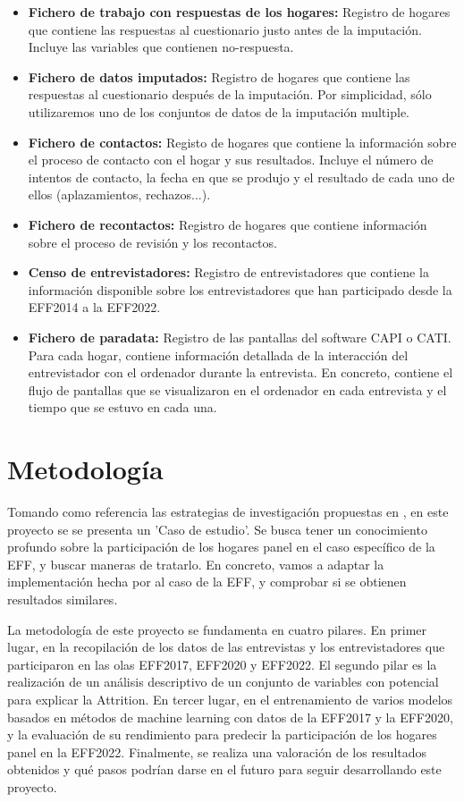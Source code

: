 \begin{itemize}
    \item \textbf{Fichero de trabajo con respuestas de los hogares:} Registro de hogares que contiene las respuestas al cuestionario justo antes de la imputación. Incluye las variables que contienen no-respuesta.
    \item \textbf{Fichero de datos imputados:} Registro de hogares que contiene las respuestas al cuestionario después de la imputación. Por simplicidad, sólo utilizaremos uno de los conjuntos de datos de la imputación multiple.
    \item \textbf{Fichero de contactos:} Registo de hogares que contiene la información sobre el proceso de contacto con el hogar y sus resultados. Incluye el número de intentos de contacto, la fecha en que se produjo y el resultado de cada uno de ellos (aplazamientos, rechazos...).
    \item \textbf{Fichero de recontactos:} Registro de hogares que contiene información sobre el proceso de revisión y los recontactos.
    \item \textbf{Censo de entrevistadores:} Registro de entrevistadores que contiene la información disponible sobre los entrevistadores que han participado desde la EFF2014 a la EFF2022.
    \item \textbf{Fichero de paradata:} Registro de las pantallas del software CAPI o CATI. Para cada hogar, contiene información detallada de la interacción del entrevistador con el ordenador durante la entrevista. En concreto, contiene el flujo de pantallas que se visualizaron en el ordenador en cada entrevista y el tiempo que se estuvo en cada una.
\end{itemize}

\section{Metodología}

Tomando como referencia las estrategias de investigación propuestas en \cite{oates2022researching}, en este proyecto se se presenta un 'Caso de estudio'. Se busca tener un conocimiento profundo sobre la participación de los hogares panel en el caso específico de la EFF, y buscar maneras de tratarlo. En concreto, vamos a adaptar la implementación hecha por \cite{beste2023case} al caso de la EFF, y comprobar si se obtienen resultados similares.

La metodología de este proyecto se fundamenta en cuatro pilares. En primer lugar, en la recopilación de los datos de las entrevistas y los entrevistadores que participaron en las olas EFF2017, EFF2020 y EFF2022. El segundo pilar es la realización de un análisis descriptivo de un conjunto de variables con potencial para explicar la Attrition. En tercer lugar, en el entrenamiento de varios modelos basados en métodos de machine learning con datos de la EFF2017 y la EFF2020, y la evaluación de su rendimiento para predecir la participación de los hogares panel en la EFF2022. Finalmente, se realiza una valoración de los resultados obtenidos y qué pasos podrían darse en el futuro para seguir desarrollando este proyecto.

